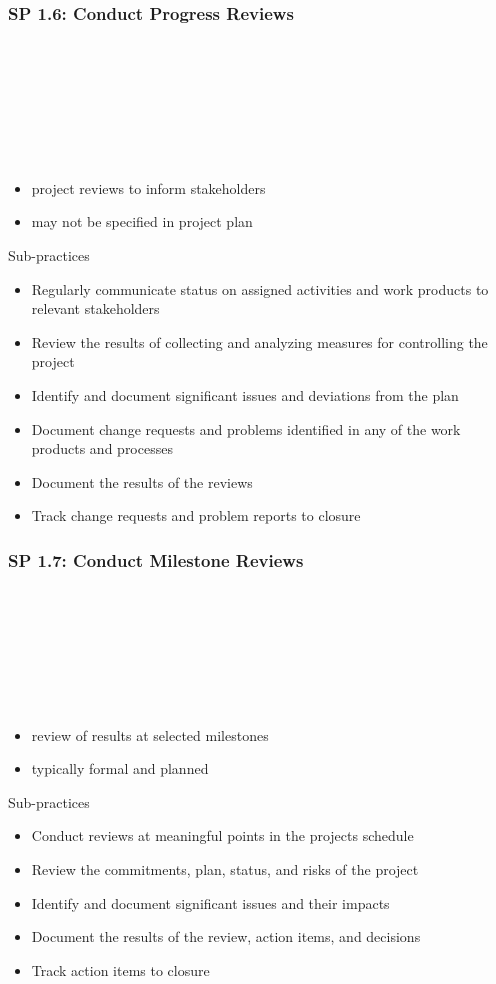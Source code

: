 \documentclass[accentcolor=tud1b]{tudbeamer}
\newcommand{\strong}[1]{\textaccentcolor{\textsf{\textbf{#1}}}}
\newenvironment*{tframe}[1][]{%
	\begin{frame}
	\ifnum\Level=2
		\frametitle{\insertsectionhead\\\strong{#1}}
	\fi\ifnum\Level=3
		\frametitle{\insertsectionhead\\\strong{\insertsubsectionhead} \textnormal{#1}}
	\fi\ifnum\Level=4
		\frametitle{\insertsubsectionhead\\\strong{\insertsubsubsectionhead} #1}
	\fi
}{%
	\end{frame}
}
\newenvironment{listblock}[1]{%
	\begin{block}{#1}
		\begin{itemize}
}{%
		\end{itemize}
	\end{block}
}
\begin{document}
\subsubsection{SP 1.6: Conduct Progress Reviews}
\begin{tframe}
	\begin{itemize}
		\item project reviews to inform stakeholders
		\item may not be specified in project plan
	\end{itemize}
	\begin{listblock}{Sub-practices}
		\item Regularly communicate status on assigned activities and work products to relevant stakeholders
		\item Review the results of collecting and analyzing measures for controlling the project
		\item Identify and document significant issues and deviations from the plan
		\item Document change requests and problems identified in any of the work products and processes
		\item Document the results of the reviews
		\item Track change requests and problem reports to closure
	\end{listblock}
\end{tframe}

\subsubsection{SP 1.7: Conduct Milestone Reviews}
\begin{tframe}
	\begin{itemize}
		\item review of results at selected milestones
		\item typically formal and planned 
	\end{itemize}
	\begin{listblock}{Sub-practices}
		\item Conduct reviews at meaningful points in the projects schedule
		\item Review the commitments, plan, status, and risks of the project
		\item Identify and document significant issues and their impacts
		\item Document the results of the review, action items, and decisions
		\item Track action items to closure
	\end{listblock}
\end{tframe}
\end{document}
